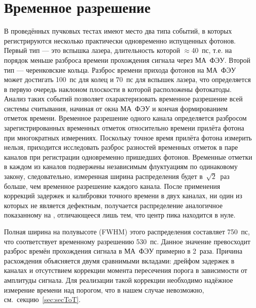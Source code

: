 \section{Временное разрешение}\label{sec:secTimeRes}

В проведённых пучковых тестах имеют место два типа событий, в которых регистрируются несколько практически одновременно испущенных фотонов. Первый тип --- это вспышка лазера, длительность которой $\approx$40~пс, т.е. на порядок меньше разброса времени прохождения сигнала через МА~ФЭУ. Второй тип --- черенковские кольца. Разброс времени прихода фотонов на МА~ФЭУ может достигать 100~пс для колец и 70~пс для вспышек лазера, что определяется в первую очередь наклоном плоскости в которой расположены фотокатоды. Анализ таких событий позволяет охарактеризовать временное разрешение всей системы считывания, начиная от окна МА~ФЭУ и кончая формированием отметок времени. Временное разрешение одного канала определяется разбросом зарегистрированных временных отметок относительно времени прилёта фотона при многократных измерениях. Поскольку точное время прилёта фотона измерить нельзя, приходится исследовать разброс разностей временных отметок в паре каналов при регистрации одновременно пришедших фотонов. Временные отметки в каждом из каналов подвержены независимым флуктуациям по одинаковому закону, следовательно, измеренная ширина распределения будет в~$\sqrt 2$~раз больше, чем временное разрешение каждого канала.
После применения коррекций задержек и калибровки точного времени в двух каналах, ни один из которых не является дефектным, получается распределение аналогичное показанному на , отличающееся лишь тем, что центр пика находится в нуле.


Полная ширина на полувысоте (FWHM) этого распределения составляет 750~пс, что соответствует временному разрешению 530~пс. Данное значение превосходит разброс времён прохождения сигнала в МА~ФЭУ примерно в 2~раза. Причина расхождения объясняется двумя сравнимыми вкладами: дрейфом задержек в каналах и отсутствием коррекции момента пересечения порога в зависимости от амплитуды сигнала. Для реализации такой коррекции необходимо надёжное измерение времени над порогом, что в нашем случае невозможно, см.~секцию~\ref{sec:secToT}.

